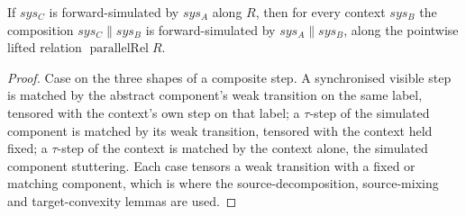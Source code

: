 \begin{theorem}
  \label{thm:precong-parallel}
  \leanok
  If $sys_C$ is forward-simulated by $sys_A$ along $R$, then for every context $sys_B$ the composition $sys_C \parallel sys_B$ is forward-simulated by $sys_A \parallel sys_B$, along the pointwise lifted relation $\operatorname{parallelRel} R$.
\end{theorem}

\begin{proof}\leanok
  Case on the three shapes of a composite step.
  A synchronised visible step is matched by the abstract component's weak transition on the same label, tensored with the context's own step on that label; a $\tau$-step of the simulated component is matched by its weak transition, tensored with the context held fixed; a $\tau$-step of the context is matched by the context alone, the simulated component stuttering.
  Each case tensors a weak transition with a fixed or matching component, which is where the source-decomposition, source-mixing and target-convexity lemmas are used.
\end{proof}
